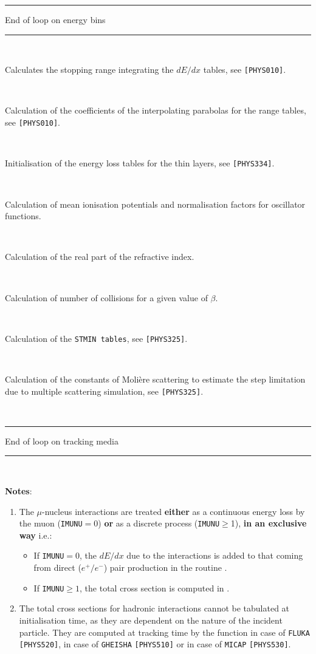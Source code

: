 \begin{tabbing}
\rule[-.1cm]{6cm}{.05cm} End of loop on energy bins 
\rule[-.1cm]{6cm}{.05cm} \rule{0cm}{.45cm} \\
 \>     \> \> \> \parbox[t]{10cm}{Calculates the stopping
range integrating the $dE/dx$ tables, see {\tt [PHYS010]}.} \rule{0cm}{.45cm} \\
 \>     \> \> \> \parbox[t]{10cm}{Calculation of the coefficients
of the interpolating parabolas for the range tables, see {\tt [PHYS010]}.} 
\rule{0cm}{.45cm} \\
 \>     \> \> \> \parbox[t]{10cm}{Initialisation of the
energy loss tables for the thin layers, see {\tt [PHYS334]}.} 
\rule{0cm}{.45cm} \\
 \> \>     \> \> \parbox[t]{10cm}{Calculation of
mean ionisation potentials and normalisation factors for
oscillator functions.} \rule{0cm}{.45cm} \\
 \> \>     \> \> \parbox[t]{10cm}{Calculation of the real
part of the refractive index.} \rule{0cm}{.45cm} \\
 \> \>     \> \> \parbox[t]{10cm}{Calculation of number of
collisions for a given value of $\beta$.} \rule{0cm}{.45cm} \\
 \>     \> \> \> \parbox[t]{10cm}{Calculation of the
{\tt STMIN tables}, see {\tt [PHYS325]}.} \rule{0cm}{.45cm} \\
 \> \>     \> \> \parbox[t]{10cm}{Calculation of the
constants of Moli\`ere scattering to estimate the step limitation
due to multiple scattering simulation, see {\tt [PHYS325]}.} 
\rule{0cm}{.45cm} \\
\rule[-.1cm]{5.5cm}{.05cm} End of loop on tracking media 
\rule[-.1cm]{5.5cm}{.05cm} 
\rule{0cm}{.45cm} \\
\end{tabbing}
{\bf Notes}:
\begin{enumerate}
\item
The $\mu$-nucleus interactions are treated
{\bf either} as a continuous energy loss by the muon ({\tt IMUNU}$=0$)
{\bf or} as a discrete process ({\tt IMUNU}$\geq$1),
{\bf in an exclusive way} i.e.:
\begin{itemize}
\item If {\tt IMUNU}$=0$, the $dE/dx$ due to the interactions is added
to that coming from direct ($ e^+/e^-$) pair production in the routine 
.
\item
If {\tt IMUNU}$\geq 1$, the total cross section is computed in 
.
\end{itemize}
\item
The total cross sections for hadronic interactions cannot be tabulated at
initialisation time, as they are dependent on the nature
of the incident particle. They are computed at tracking time by the function
 in case of {\tt FLUKA} {\tt [PHYS520]},  
in case of {\tt GHEISHA} {\tt [PHYS510]} or  in case of {\tt MICAP}
{\tt [PHYS530]}.
\end{enumerate}
 
